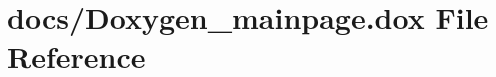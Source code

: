 \hypertarget{Doxygen__mainpage_8dox}{}\section{docs/\+Doxygen\+\_\+mainpage.dox File Reference}
\label{Doxygen__mainpage_8dox}
